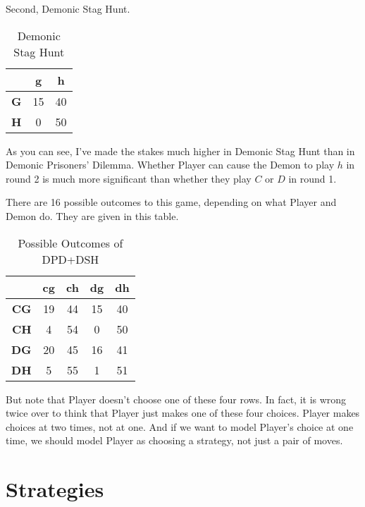 \documentclass[
  12pt,
]{article}
\begin{document}
Second, Demonic Stag Hunt.

\begin{table}[H]

\caption{\label{tab:unnamed-chunk-9}Demonic Stag Hunt}
\centering
\begin{tabular}[t]{>{}r|cc}

\textbf{} & \textbf{g} & \textbf{h}\\
\midrule
\textbf{G} & 15 & 40\\
\textbf{H} & 0 & 50\\

\end{tabular}
\end{table}

As you can see, I've made the stakes much higher in Demonic Stag Hunt
than in Demonic Prisoners' Dilemma. Whether Player can cause the Demon
to play \(h\) in round 2 is much more significant than whether they play
\(C\) or \(D\) in round 1.

There are 16 possible outcomes to this game, depending on what Player
and Demon do. They are given in this table.

\begin{table}[H]

\caption{\label{tab:unnamed-chunk-10}Possible Outcomes of DPD+DSH}
\centering
\begin{tabular}[t]{>{}r|cccc}

\textbf{} & \textbf{cg} & \textbf{ch} & \textbf{dg} & \textbf{dh}\\
\midrule
\textbf{CG} & 19 & 44 & 15 & 40\\
\textbf{CH} & 4 & 54 & 0 & 50\\
\textbf{DG} & 20 & 45 & 16 & 41\\
\textbf{DH} & 5 & 55 & 1 & 51\\

\end{tabular}
\end{table}

But note that Player doesn't choose one of these four rows. In fact, it
is wrong twice over to think that Player just makes one of these four
choices. Player makes choices at two times, not at one. And if we want
to model Player's choice at one time, we should model Player as choosing
a strategy, not just a pair of moves.

\hypertarget{strategies}{%
\section{Strategies}\label{strategies}}
\end{document}
